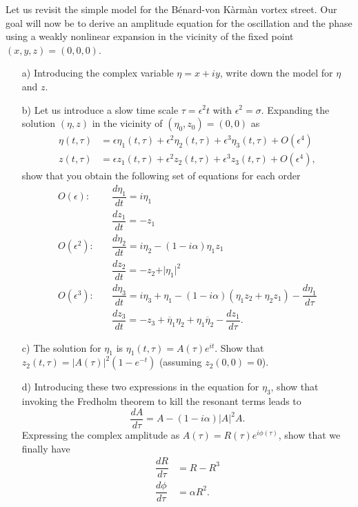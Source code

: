 \bigskip

\begin{problem}
  Let us revisit the simple model for the Bénard-von Kàrmàn vortex street.
  Our goal will now be to derive an amplitude equation for the oscillation and the phase using a weakly nonlinear expansion in the vicinity of the fixed point $(x, y, z) = (0, 0, 0)$.

  \begin{enumerate}
  \item[a)] Introducing the complex variable $\eta = x + i y$, write down the model for $\eta$ and $z$.

  \item[b)] Let us introduce a slow time scale $\tau = \epsilon^2 t$ with $\epsilon^2 = \sigma$.
    Expanding the solution $(\eta, z)$ in the vicinity of $(\eta_0, z_0) = (0, 0)$ as
    \[
    \begin{aligned}
      \eta(t, \tau) & = \epsilon \eta_1(t, \tau) + \epsilon^2 \eta_2(t, \tau) + \epsilon^3 \eta_3(t, \tau) + O(\epsilon^4)\\
      z(t, \tau) & = \epsilon z_1(t, \tau) + \epsilon^2 z_2(t, \tau) + \epsilon^3 z_3(t, \tau) + O(\epsilon^4),
    \end{aligned}
    \]
    show that you obtain the following set of equations for each order
    \[
    \begin{aligned}
      O(\epsilon) : \quad & \dfrac{d\eta_1}{dt} = i \eta_1 \\
      & \dfrac{dz_1}{dt} = - z_1 \\
      O(\epsilon^2) : \quad & \dfrac{d\eta_2}{dt} = i \eta_2 - (1 - i\alpha) \eta_1 z_1 \\
      & \dfrac{dz_2}{dt} = - z_2 + \vert \eta_1 \vert^2 \\
      O(\epsilon^3) : \quad & \dfrac{d\eta_3}{dt} = i \eta_3 + \eta_1 - (1 - i\alpha)(\eta_1 z_2 + \eta_2 z_1) - \dfrac{d\eta_1}{d\tau} \\
      & \dfrac{dz_3}{dt} = - z_3 + \overline{\eta}_1 \eta_2 + \eta_1 \overline{\eta}_2 - \dfrac{dz_1}{d\tau}.
    \end{aligned}
    \]

  \item[c)] The solution for $\eta_1$ is \( \eta_1(t, \tau) = A(\tau) e^{it}\).
    Show that \( z_2(t, \tau) = \vert A(\tau) \vert^2 \left( 1 - e^{-t} \right) \) (assuming $z_2(0, 0) = 0$).

  \item[d)] Introducing these two expressions in the equation for $\eta_3$, show that invoking the Fredholm theorem to kill the resonant terms leads to
    \[
    \dfrac{dA}{d\tau} = A - \left( 1 - i\alpha \right) \vert A \vert^2 A.
    \]
    Expressing the complex amplitude as $A(\tau) = R(\tau) e^{i \phi(\tau)}$, show that we finally have
    \[
    \begin{aligned}
      \dfrac{dR}{d\tau} & = R - R^3 \\
      \dfrac{d\phi}{d\tau} & = \alpha R^2.
    \end{aligned}
    \]


\end{enumerate}
\end{problem}
